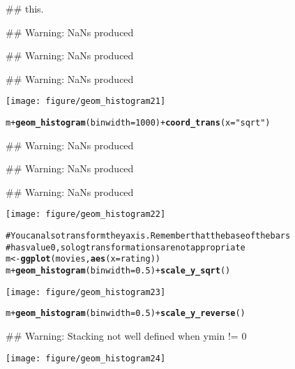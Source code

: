 \documentclass[a4paper,titlepage]{tufte-handout}\usepackage{graphicx, color}
\makeatletter
\def\maxwidth{ %
  \ifdim\Gin@nat@width>\linewidth
    \linewidth
  \else
    \Gin@nat@width
  \fi
}
\newcommand{\hlfunctioncall}[1]{\textcolor[rgb]{0.501960784313725,0,0.329411764705882}{\textbf{#1}}}%
\newcommand{\hlstring}[1]{\textcolor[rgb]{0.6,0.6,1}{#1}}%
\newcommand{\hlcomment}[1]{\textcolor[rgb]{0.180392156862745,0.6,0.341176470588235}{#1}}%
\newenvironment{kframe}{%
 \def\at@end@of@kframe{}%
 \ifinner\ifhmode%
  \def\at@end@of@kframe{\end{minipage}}%
  \begin{minipage}{\columnwidth}%
 \fi\fi%
 \def\FrameCommand##1{\hskip\@totalleftmargin \hskip-\fboxsep
 \colorbox{shadecolor}{##1}\hskip-\fboxsep
     \hskip-\linewidth \hskip-\@totalleftmargin \hskip\columnwidth}%
 \MakeFramed {\advance\hsize-\width
   \@totalleftmargin\z@ \linewidth\hsize
   \@setminipage}}%
 {\par\unskip\endMakeFramed%
 \at@end@of@kframe}
\newenvironment{knitrout}{}{} %
\makeatother
\begin{document}
\begin{knitrout}
\begin{kframe}
\begin{flushleft}
{\#\# this.}\end{flushleft}\begin{flushleft}\ttfamily\noindent\textcolor{warningcolor}{\#\# Warning: NaNs produced}\end{flushleft}\begin{flushleft}\ttfamily\noindent\textcolor{warningcolor}{\#\# Warning: NaNs produced}\end{flushleft}\begin{flushleft}\ttfamily\noindent\textcolor{warningcolor}{\#\# Warning: NaNs produced}\end{flushleft}\end{kframe}\texttt{[image: figure/geom\_histogram21]} \begin{kframe}\begin{alltt}
m + \hlfunctioncall{geom_histogram}(binwidth=1000) + \hlfunctioncall{coord_trans}(x = \hlstring{"sqrt"})
\end{alltt}
\begin{flushleft}\ttfamily\noindent\textcolor{warningcolor}{\#\# Warning: NaNs produced}\end{flushleft}\begin{flushleft}\ttfamily\noindent\textcolor{warningcolor}{\#\# Warning: NaNs produced}\end{flushleft}\begin{flushleft}\ttfamily\noindent\textcolor{warningcolor}{\#\# Warning: NaNs produced}\end{flushleft}\end{kframe}\texttt{[image: figure/geom\_histogram22]} \begin{kframe}\begin{alltt}
\hlcomment{# You can also transform the y axis.  Remember that the base of the bars}
\hlcomment{# has value 0, so log transformations are not appropriate}
m <- \hlfunctioncall{ggplot}(movies, \hlfunctioncall{aes}(x = rating))
m + \hlfunctioncall{geom_histogram}(binwidth = 0.5) + \hlfunctioncall{scale_y_sqrt}()
\end{alltt}
\end{kframe}\texttt{[image: figure/geom\_histogram23]} \begin{kframe}\begin{alltt}
m + \hlfunctioncall{geom_histogram}(binwidth = 0.5) + \hlfunctioncall{scale_y_reverse}()
\end{alltt}
\begin{flushleft}\ttfamily\noindent\textcolor{warningcolor}{\#\# Warning: Stacking not well defined when ymin != 0}\end{flushleft}\end{kframe}\texttt{[image: figure/geom\_histogram24]} \begin{kframe}\begin{alltt}

\end{alltt}
\end{kframe}
\end{knitrout}
\end{document}
